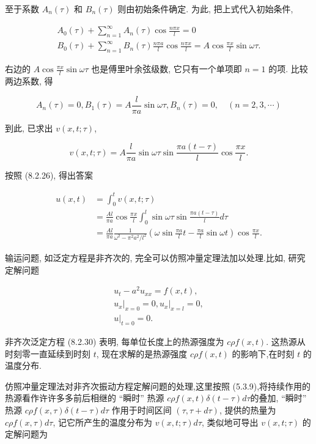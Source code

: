 至于系数 $A_{n}(\tau)$ 和 $B_{n}(\tau)$ 则由初始条件确定. 为此, 把上式代入初始条件,

$$
\begin{gathered}
A_{0}(\tau)+\sum_{n=1}^{\infty} A_{n}(\tau) \cos \frac{n \pi x}{l}=0 \\
B_{0}(\tau)+\sum_{n=1}^{\infty} B_{n}(\tau) \frac{n \pi a}{l} \cos \frac{n \pi x}{l}=A \cos \frac{\pi x}{l} \sin \omega \tau .
\end{gathered}
$$

右边的 $A \cos \frac{\pi x}{l} \sin \omega \tau$ 也是傅里叶余弦级数, 它只有一个单项即 $n=1$ 的项. 比较两边系数, 得

$$
A_{n}(\tau)=0, B_{1}(\tau)=A \frac{l}{\pi a} \sin \omega \tau, B_{n}(\tau)=0, \quad(n=2,3, \cdots)
$$

到此, 已求出 $v(x, t ; \tau)$,

$$
v(x, t ; \tau)=A \frac{l}{\pi a} \sin \omega \tau \sin \frac{\pi a(t-\tau)}{l} \cos \frac{\pi x}{l} .
$$

按照 (8.2.26), 得出答案

$$
\begin{aligned}
u(x, t) & =\int_{0}^{t} v(x, t ; \tau) \\
& =\frac{A l}{\pi a} \cos \frac{\pi x}{l} \int_{0}^{l} \sin \omega \tau \sin \frac{\pi a(t-\tau)}{l} d \tau \\
& =\frac{A l}{\pi a} \frac{1}{\omega^{2}-\pi^{2} a^{2} / l^{2}}\left(\omega \sin \frac{\pi a}{l} t-\frac{\pi a}{l} \sin \omega t\right) \cos \frac{\pi x}{l} .
\end{aligned}
$$

输运问题, 如泛定方程是非齐次的, 完全可以仿照冲量定理法加以处理.比如, 研究定解问题

$$
\begin{gathered}
u_{t}-a^{2} u_{x x}=f(x, t), \\
\left.u_{x}\right|_{x=0}=0,\left.u_{x}\right|_{x=l}=0, \\
\left.u\right|_{t=0}=0 .
\end{gathered}
$$

非齐次泛定方程 (8.2.30) 表明, 每单位长度上的热源强度为 $c \rho f(x, t)$. 这热源从时刻零一直延续到时刻 $t$, 现在求解的是热源强度 $c \rho f(x, t)$ 的影响下,在时刻 $t$ 的温度分布.

仿照冲量定理法对非齐次振动方程定解问题的处理,这里按照 (5.3.9),将持续作用的热源看作许许多多前后相继的 “瞬时” 热源 $c \rho f(x, t) \delta(t-\tau) d \tau$的叠加, “瞬时” 热源 $c \rho f(x, \tau) \delta(t-\tau) d \tau$ 作用于时间区间 $(\tau, \tau+d \tau)$, 提供的热量为 $c \rho f(x, \tau) d \tau$, 记它所产生的温度分布为 $v(x, t ; \tau) d \tau$, 类似地可导出 $v(x, t ; \tau)$ 的定解问题为

